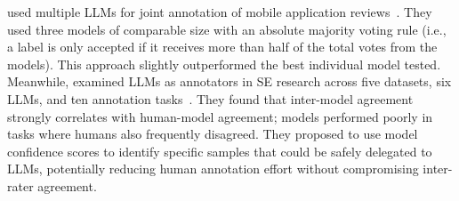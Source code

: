 \citeauthor{Huang2023Enhancing} used multiple LLMs for joint annotation of mobile application reviews~\cite{Huang2023Enhancing}.
They used three models of comparable size with an absolute majority voting rule (i.e., a label is only accepted if it receives more than half of the total votes from the models). This approach slightly outperformed the best individual model tested. 
Meanwhile, \citeauthor{DBLP:conf/msr/AhmedDTP25} examined LLMs as annotators in SE research across five datasets, six LLMs, and ten annotation tasks~\cite{DBLP:conf/msr/AhmedDTP25}.
They found that inter-model agreement strongly correlates with human-model agreement; models performed poorly in tasks where humans also frequently disagreed. They proposed to use model confidence scores to identify specific samples that could be safely delegated to LLMs, potentially reducing human annotation effort without compromising inter-rater agreement.

